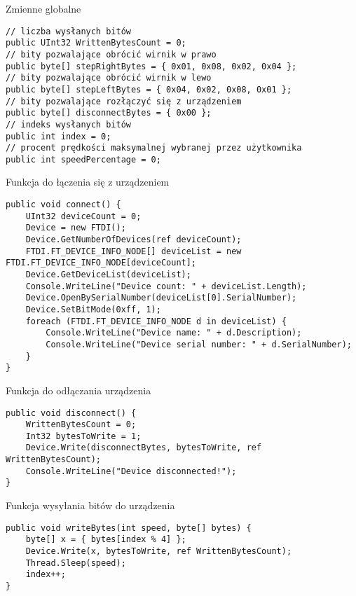 \documentclass{article}
\begin{document}
\begin{listing}
\caption{Zmienne globalne}
\begin{verbatim}
// liczba wysłanych bitów
public UInt32 WrittenBytesCount = 0;
// bity pozwalające obrócić wirnik w prawo
public byte[] stepRightBytes = { 0x01, 0x08, 0x02, 0x04 };
// bity pozwalające obrócić wirnik w lewo
public byte[] stepLeftBytes = { 0x04, 0x02, 0x08, 0x01 };
// bity pozwalające rozłączyć się z urządzeniem
public byte[] disconnectBytes = { 0x00 };
// indeks wysłanych bitów
public int index = 0;
// procent prędkości maksymalnej wybranej przez użytkownika
public int speedPercentage = 0;
\end{verbatim}
\label{lst:global}
\end{listing}

\begin{listing}[H]
\caption{Funkcja do łączenia się z urządzeniem}
\begin{verbatim}
public void connect() {
    UInt32 deviceCount = 0;
    Device = new FTDI();
    Device.GetNumberOfDevices(ref deviceCount);
    FTDI.FT_DEVICE_INFO_NODE[] deviceList = new FTDI.FT_DEVICE_INFO_NODE[deviceCount];
    Device.GetDeviceList(deviceList);
    Console.WriteLine("Device count: " + deviceList.Length);
    Device.OpenBySerialNumber(deviceList[0].SerialNumber);
    Device.SetBitMode(0xff, 1);
    foreach (FTDI.FT_DEVICE_INFO_NODE d in deviceList) {
        Console.WriteLine("Device name: " + d.Description);
        Console.WriteLine("Device serial number: " + d.SerialNumber);
    }
}
\end{verbatim}
\label{lst:connect}
\end{listing}

\begin{listing}[H]
\caption{Funkcja do odłączania urządzenia}
\begin{verbatim}
public void disconnect() {
    WrittenBytesCount = 0;
    Int32 bytesToWrite = 1;
    Device.Write(disconnectBytes, bytesToWrite, ref WrittenBytesCount);
    Console.WriteLine("Device disconnected!");
}
\end{verbatim}
\label{lst:disconnect}
\end{listing}

\begin{listing}[H]
\caption{Funkcja wysyłania bitów do urządzenia}
\begin{verbatim}
public void writeBytes(int speed, byte[] bytes) {
    byte[] x = { bytes[index % 4] };
    Device.Write(x, bytesToWrite, ref WrittenBytesCount);
    Thread.Sleep(speed);
    index++;
}
\end{verbatim}
\label{lst:write_bytes}
\end{listing}
\end{document}
